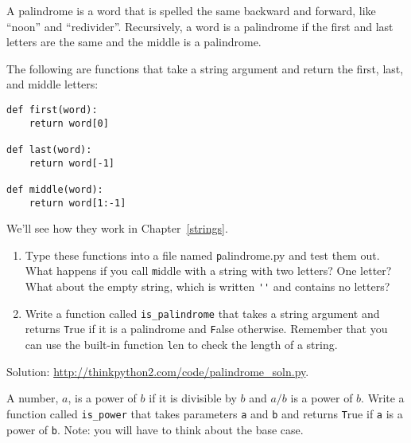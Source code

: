 \documentclass[
DIV=11,
fontsize=12,
twoside,
headinclude=false,
titlepage=firstiscover,
abstract=true,
headsepline=true,
footsepline=true,
chapterprefix=true, %
headings=big,
bibliography=totoc,%
captions=tableheading
]{scrbook}
\theoremstyle{definition}
\begin{document}
\begin{exercise}
\normalfont
\label{palindrome}

A palindrome is a word that is spelled the same backward and
forward, like ``noon'' and ``redivider''.  Recursively, a word
is a palindrome if the first and last letters are the same
and the middle is a palindrome.

The following are functions that take a string argument and
return the first, last, and middle letters:

\begin{lstlisting}
def first(word):
    return word[0]

def last(word):
    return word[-1]

def middle(word):
    return word[1:-1]
\end{lstlisting}
%
We'll see how they work in Chapter~\ref{strings}.

\begin{enumerate}

\item Type these functions into a file named {\texttt palindrome.py}
and test them out.  What happens if you call {\texttt middle} with
a string with two letters?  One letter?  What about the empty
string, which is written \verb"''" and contains no letters?

\item Write a function called \verb"is_palindrome" that takes
a string argument and returns {\texttt True} if it is a palindrome
and {\texttt False} otherwise.  Remember that you can use the
built-in function {\texttt len} to check the length of a string.

\end{enumerate}

Solution: \url{http://thinkpython2.com/code/palindrome_soln.py}.

\end{exercise}

\begin{exercise}
\normalfont

A number, $a$, is a power of $b$ if it is divisible by $b$
and $a/b$ is a power of $b$.  Write a function called
\verb"is_power" that takes parameters {\texttt a} and {\texttt b}
and returns {\texttt True} if {\texttt a} is a power of {\texttt b}.
Note: you will have to think about the base case.

\end{exercise}
\end{document}
